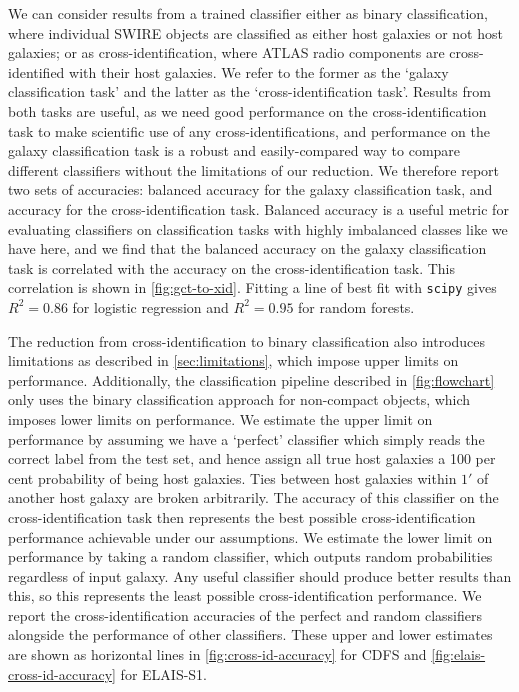 \documentclass[fleqn,usenatbib,usedcolumn]{mnras}
\begin{document}
    We can consider results from a trained classifier either as binary
    classification, where individual SWIRE objects are classified as either
    host galaxies or not host galaxies; or as cross-identification, where
    ATLAS radio components are cross-identified with their host galaxies. We
    refer to the former as the `galaxy classification task' and the latter as
    the `cross-identification task'. Results from both tasks are useful, as we
    need good performance on the cross-identification task to make scientific
    use of any cross-identifications, and performance on the galaxy
    classification task is a robust and easily-compared way to compare
    different classifiers without the limitations of our reduction. We
    therefore report two sets of accuracies: balanced accuracy for the galaxy
    classification task, and accuracy for the cross-identification task.
    Balanced accuracy is a useful metric for evaluating classifiers on
    classification tasks with highly imbalanced classes like we have here, and
    we find that the balanced accuracy on the galaxy classification task is
    correlated with the accuracy on the cross-identification task. This
    correlation is shown in \autoref{fig:gct-to-xid}. Fitting a line of best
    fit with \texttt{scipy} gives $R^2 = 0.86$ for logistic regression and
    $R^2 = 0.95$ for random forests.

    The reduction from cross-identification to binary classification also
    introduces limitations as described in \autoref{sec:limitations}, which
    impose upper limits on performance. Additionally, the classification
    pipeline described in \autoref{fig:flowchart} only uses the binary
    classification approach for non-compact objects, which imposes lower
    limits on performance. We estimate the upper limit on performance by
    assuming we have a `perfect' classifier which simply reads the correct
    label from the test set, and hence assign all true host galaxies a 100 per
    cent probability of being host galaxies. Ties between host galaxies within
    $1'$ of another host galaxy are broken arbitrarily. The accuracy of this
    classifier on the cross-identification task then represents the best
    possible cross-identification performance achievable under our
    assumptions. We estimate the lower limit on performance by taking a random
    classifier, which outputs random probabilities regardless of input galaxy.
    Any useful classifier should produce better results than this, so this
    represents the least possible cross-identification performance. We report
    the cross-identification accuracies of the perfect and random classifiers
    alongside the performance of other classifiers. These upper and lower
    estimates are shown as horizontal lines in \autoref{fig:cross-id-accuracy}
    for CDFS and \autoref{fig:elais-cross-id-accuracy} for ELAIS-S1.
\end{document}
